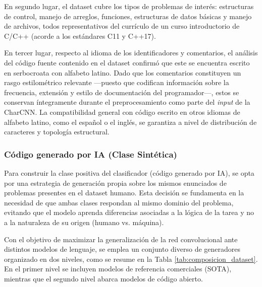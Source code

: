En segundo lugar, el dataset cubre los tipos de problemas de interés: estructuras de control, manejo de arreglos, funciones, estructuras de datos básicas y manejo de archivos, todos representativos del currículo de un curso introductorio de C/C++ (acorde a los estándares C11 y C++17).

En tercer lugar, respecto al idioma de los identificadores y comentarios, el análisis del código fuente contenido en el dataset confirmó que este se encuentra escrito en serbocroata con alfabeto latino. Dado que los comentarios constituyen un rasgo estilométrico relevante —puesto que codifican información sobre la frecuencia, extensión y estilo de documentación del programador—, estos se conservan íntegramente durante el preprocesamiento como parte del \textit{input} de la CharCNN. La compatibilidad general con código escrito en otros idiomas de alfabeto latino, como el español o el inglés, se garantiza a nivel de distribución de caracteres y topología estructural.

\subsubsection{Código generado por IA (Clase Sintética)}

Para construir la clase positiva del clasificador (código generado por IA), se opta por una estrategia de generación propia sobre los mismos enunciados de problemas presentes en el dataset humano. Esta decisión se fundamenta en la necesidad de que ambas clases respondan al mismo dominio del problema, evitando que el modelo aprenda diferencias asociadas a la lógica de la tarea y no a la naturaleza de su origen (humano vs. máquina).

Con el objetivo de maximizar la generalización de la red convolucional ante distintos modelos de lenguaje, se emplea un conjunto diverso de generadores organizado en dos niveles, como se resume en la Tabla \ref{tab:composicion_dataset}. En el primer nivel se incluyen modelos de referencia comerciales (SOTA), mientras que el segundo nivel abarca modelos de código abierto.

